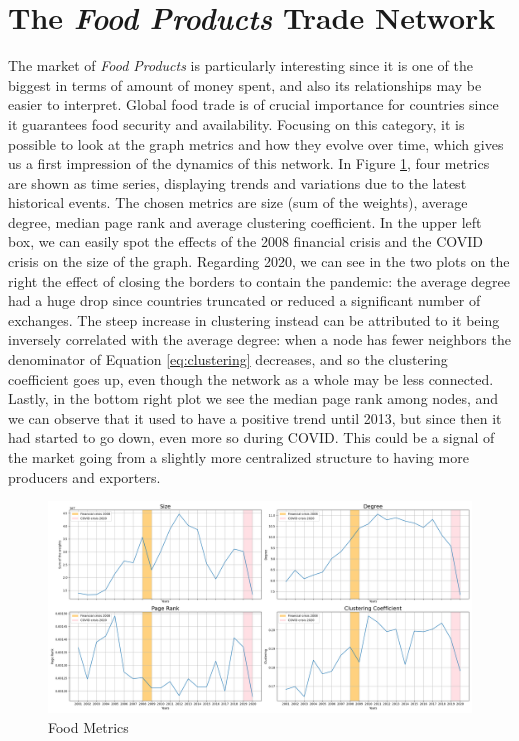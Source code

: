 \section{The \textit{Food Products} Trade Network}

The market of \textit{Food Products} is particularly interesting since it is one of the biggest in terms of amount of money spent, and also its relationships may be easier to interpret. Global food trade is of crucial importance for countries since it guarantees food security and availability. Focusing on this category, it is possible to look at the graph metrics and how they evolve over time, which gives us a first impression of the dynamics of this network. In Figure \ref{fig:foodmetrics}, four metrics are shown as time series, displaying trends and variations due to the latest historical events. The chosen metrics are size (sum of the weights), average degree, median page rank and average clustering coefficient.
In the upper left box, we can easily spot the effects of the 2008 financial crisis and the COVID crisis on the size of the graph. 
Regarding 2020, we can see in the two plots on the right the effect of closing the borders to contain the pandemic: the average degree had a huge drop since countries truncated or reduced a significant number of exchanges. The steep increase in clustering instead can be attributed to it being inversely correlated with the average degree: when a node has fewer neighbors the denominator of Equation \ref{eq:clustering} decreases, and so the clustering coefficient goes up, even though the network as a whole may be less connected.
Lastly, in the bottom right plot we see the median page rank among nodes, and we can observe that it used to have a positive trend until 2013, but since then it had started to go down, even more so during COVID. This could be a signal of the market going from a slightly more centralized structure to having more producers and exporters.

\begin{figure}
    \centering
    \includegraphics[width=\textwidth]{pics/full_p10_metric_ts.png}
    \caption{Food Metrics}
    \label{fig:foodmetrics}
\end{figure}



